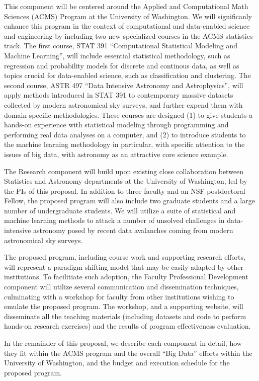 This component will be centered around the Applied and Computational Math Sciences (ACMS) 
Program at the University of Washington. We will significanly enhance this program in the context of computational 
and data-enabled science and engineering by including two new specialized courses in the ACMS statistics track. 
The first course, STAT 391 ``Computational Statistical Modeling and Machine Learning'', will include essential statistical 
methodology, such as regression and probability models for discrete and continous data, as well as topics crucial for 
data-enabled science, such as classification and clustering. The second course, ASTR 497 ``Data Intensive Astronomy 
and Astrophysics'', will apply methods introduced in STAT 391 to contemporary massive datasets collected by modern 
astronomical sky surveys, and further expend them with domain-specific methodologies. These courses are designed 
(1) to give students a hands-on experience with statistical modeling through programming and performing real data 
analyses on a computer, and (2) to introduce students to the machine learning methodology in particular, with specific 
attention to the issues of big data, with astronomy as an attractive core science example. 

The Research component will build upon existing close collaboration between Statistics and Astronomy departments at the 
University of Washington, led by the PIs of this proposal. In addition to three faculty and an NSF postdoctoral Fellow, 
the proposed program will also include two graduate students and a large number of undergraduate students. We will 
utilize a suite of statistical and machine learning methods to attack a number of unsolved challenges in data-intensive 
astronomy posed by recent data avalanches coming from modern astronomical sky surveys. 

The proposed program, including course work and supporting research efforts, will represent a paradigm-shifting model  
that may be easily adapted by other institutions. To facilitiate such adoption, the Faculty Professional Development component 
will utilize several communication and dissemination techniques, culminating with a workshop for faculty from other 
institutions wishing to emulate the proposed program. The workshop, and a supporting website, will disseminate all the 
teaching materials (including datasets and code to perform hands-on research exercises) and the results of program 
effectiveness evaluation. 

In the remainder of this proposal, we describe each component in
detail, how they fit within the ACMS program and the overall ``Big
Data'' efforts within the University of Washington, and the budget and
execution schedule for the proposed program.



